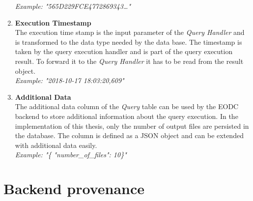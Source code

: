 \documentclass[draft,final]{vutinfth} %
\begin{document}
\begin{enumerate}
	\textit{Example: "565D229FCE4772869343\dots"} 
	\item \textbf{Execution Timestamp} \\
	The execution time stamp is the input parameter of the \textit{Query Handler} and is transformed to the data type needed by the data base. The timestamp is taken by the query execution handler and is part of the query execution result. To forward it to the \textit{Query Handler} it has to be read from the result object. \\
	\textit{Example: "2018-10-17 18:03:20,609"}  
	\item \textbf{Additional Data} \\
	The additional data column of the \textit{Query} table can be used by the EODC backend to store additional information about the query execution. In the implementation of this thesis, only the number of output files are persisted in the database. The column is defined as a JSON object and can be extended with additional data easily. \\
	\textit{Example: "\{ "number\_of\_files": 10\}"}    	 
\end{enumerate}


\section{Backend provenance}\label{Implementation:Backend provenance}
\end{document}
